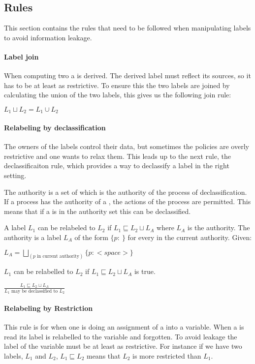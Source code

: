 \subsection{Rules}
This section contains the rules that need to be followed when manipulating labels to avoid information leakage.

\paragraph{Label join}
When computing two \xvalues{} a \xvalue{} is derived.
The derived \xvalues{} label must reflect its sources, so it has to be at least as restrictive.
To ensure this the two labels are joined by calculating the union of the two labels, this gives us the following join rule:
\begin{definition}
  $L_1 \sqcup L_2 = L_1 \cup L_2$
\end{definition}


\paragraph{Relabeling by declassification}
The owners of the labels control their data, but sometimes the policies are overly restrictive and one wants to relax them.
This leads up to the next rule, the declassificaiton rule, which provides a way to declassify a label in the right setting.

The authority is a set of \principals{} which is the authority of the process of declassification.
If a process has the authority of a \principal{}, the actions of the process are permitted.
This means that if a \principal{} is in the authority set this can be declassified.

A label $L_1$ can be relabeled to $L_2$ if $L_1 \sqsubseteq L_2 \sqcup L_A$ where $L_A$ is the authority.
The authority is a label $L_A$ of the form $\{p: \ \}$ for every \principal{} in the current authority.
Given:
\begin{center}
  $L_A = \bigsqcup_{(p \text{ in current authority})}\{p: <space> \}$
\end{center}
$L_1$ can be relabelled to $L_2$ if $L_1 \sqsubseteq L_2 \sqcup L_A$ is true.
\begin{definition}
    $\frac{L_1 \sqsubseteq L_2 \sqcup L_A}{L_1 \text{ may be declassified to } L_2}$
\end{definition}

\paragraph{Relabeling by Restriction}
This rule is for when one is doing an assignment of a \xvalue{} into a variable.
When a \xvalue{} is read its label is relabelled to the variable and forgotten.
To avoid leakage the label of the variable must be at least as restrictive.
For instance if we have two labels, $L_1$ and $L_2$, $L_1 \sqsubseteq L_2$ means that $L_2$ is more restricted than $L_1$.

